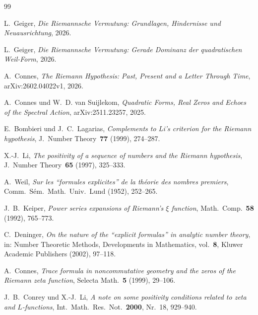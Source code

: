 \documentclass[12pt,a4paper]{article}
\theoremstyle{definition}
\theoremstyle{remark}
\begin{document}
\begin{thebibliography}{99}

L.~Geiger, \emph{Die Riemannsche Vermutung: Grundlagen, Hindernisse und Neuausrichtung}, 2026.

L.~Geiger, \emph{Die Riemannsche Vermutung: Gerade Dominanz der quadratischen Weil-Form}, 2026.

A.~Connes, \emph{The Riemann Hypothesis: Past, Present and a Letter Through Time}, arXiv:2602.04022v1, 2026.

A.~Connes und W.~D. van Suijlekom, \emph{Quadratic Forms, Real Zeros and Echoes of the Spectral Action}, arXiv:2511.23257, 2025.

E.~Bombieri und J.~C.~Lagarias, \emph{Complements to Li's criterion for the Riemann hypothesis}, J.~Number Theory~\textbf{77} (1999), 274--287.

X.-J.~Li, \emph{The positivity of a sequence of numbers and the Riemann hypothesis}, J.~Number Theory~\textbf{65} (1997), 325--333.

A.~Weil, \emph{Sur les ``formules explicites'' de la th\'eorie des nombres premiers}, Comm.~S\'em.~Math.~Univ.~Lund (1952), 252--265.

J.~B.~Keiper, \emph{Power series expansions of Riemann's $\xi$ function}, Math.~Comp.~\textbf{58} (1992), 765--773.

C.~Deninger, \emph{On the nature of the ``explicit formulas'' in analytic number theory}, in: Number Theoretic Methods, Developments in Mathematics, vol.~\textbf{8}, Kluwer Academic Publishers (2002), 97--118.

A.~Connes, \emph{Trace formula in noncommutative geometry and the zeros of the Riemann zeta function}, Selecta Math.~\textbf{5} (1999), 29--106.

J.~B.~Conrey und X.-J.~Li, \emph{A note on some positivity conditions related to zeta and $L$-functions}, Int.~Math.~Res.~Not.~\textbf{2000}, Nr.~18, 929--940.

\end{thebibliography}
\end{document}
